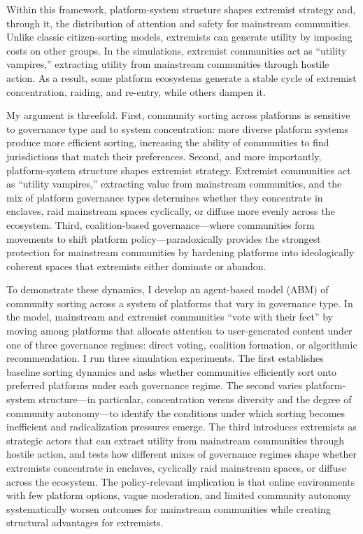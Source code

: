 \documentclass[12pt]{article}
\begin{document}
Within this framework, platform-system structure shapes extremist strategy and, through it, the distribution of attention and safety for mainstream communities. Unlike classic citizen-sorting models, extremists can generate utility by imposing costs on other groups. In the simulations, extremist communities act as ``utility vampires,'' extracting utility from mainstream communities through hostile action. As a result, some platform ecosystems generate a stable cycle of extremist concentration, raiding, and re-entry, while others dampen it.

My argument is threefold. First, community sorting across platforms is sensitive to governance type and to system concentration: more diverse platform systems produce more efficient sorting, increasing the ability of communities to find jurisdictions that match their preferences. Second, and more importantly, platform-system structure shapes extremist strategy. Extremist communities act as ``utility vampires,'' extracting value from mainstream communities, and the mix of platform governance types determines whether they concentrate in enclaves, raid mainstream spaces cyclically, or diffuse more evenly across the ecosystem. Third, coalition-based governance---where communities form movements to shift platform policy---paradoxically provides the strongest protection for mainstream communities by hardening platforms into ideologically coherent spaces that extremists either dominate or abandon.

To demonstrate these dynamics, I develop an agent-based model (ABM) of community sorting across a system of platforms that vary in governance type. In the model, mainstream and extremist communities ``vote with their feet'' by moving among platforms that allocate attention to user-generated content under one of three governance regimes: direct voting, coalition formation, or algorithmic recommendation. I run three simulation experiments. The first establishes baseline sorting dynamics and asks whether communities efficiently sort onto preferred platforms under each governance regime. The second varies platform-system structure---in particular, concentration versus diversity and the degree of community autonomy---to identify the conditions under which sorting becomes inefficient and radicalization pressures emerge. The third introduces extremists as strategic actors that can extract utility from mainstream communities through hostile action, and tests how different mixes of governance regimes shape whether extremists concentrate in enclaves, cyclically raid mainstream spaces, or diffuse across the ecosystem. The policy-relevant implication is that online environments with few platform options, vague moderation, and limited community autonomy systematically worsen outcomes for mainstream communities while creating structural advantages for extremists.
\end{document}
